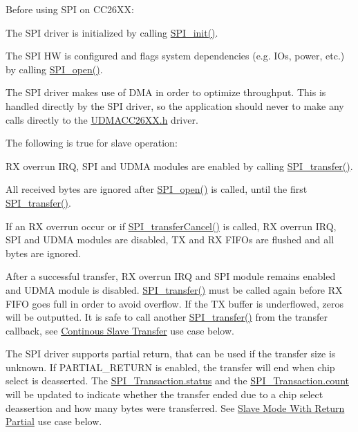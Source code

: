 Before using S\+P\+I on C\+C26\+X\+X\+:
\begin{DoxyItemize}
\item The S\+P\+I driver is initialized by calling \hyperlink{_s_p_i_8h_afd9b09f58917f0e2d14c61b956eba214}{S\+P\+I\+\_\+init()}.
\item The S\+P\+I H\+W is configured and flags system dependencies (e.\+g. I\+Os, power, etc.) by calling \hyperlink{_s_p_i_8h_a62cfe494cb1df47cd602e8747e894fd1}{S\+P\+I\+\_\+open()}.
\item The S\+P\+I driver makes use of D\+M\+A in order to optimize throughput. This is handled directly by the S\+P\+I driver, so the application should never to make any calls directly to the \hyperlink{_u_d_m_a_c_c26_x_x_8h}{U\+D\+M\+A\+C\+C26\+X\+X.\+h} driver.
\end{DoxyItemize}

The following is true for slave operation\+:
\begin{DoxyItemize}
\item R\+X overrun I\+R\+Q, S\+P\+I and U\+D\+M\+A modules are enabled by calling \hyperlink{_s_p_i_8h_a989e17f96b54fcc3dc2cac5f8ac6bdb2}{S\+P\+I\+\_\+transfer()}.
\item All received bytes are ignored after \hyperlink{_s_p_i_8h_a62cfe494cb1df47cd602e8747e894fd1}{S\+P\+I\+\_\+open()} is called, until the first \hyperlink{_s_p_i_8h_a989e17f96b54fcc3dc2cac5f8ac6bdb2}{S\+P\+I\+\_\+transfer()}.
\item If an R\+X overrun occur or if \hyperlink{_s_p_i_8h_a6819f7761fc3505c4f885653ff8121f0}{S\+P\+I\+\_\+transfer\+Cancel()} is called, R\+X overrun I\+R\+Q, S\+P\+I and U\+D\+M\+A modules are disabled, T\+X and R\+X F\+I\+F\+Os are flushed and all bytes are ignored.
\item After a successful transfer, R\+X overrun I\+R\+Q and S\+P\+I module remains enabled and U\+D\+M\+A module is disabled. \hyperlink{_s_p_i_8h_a989e17f96b54fcc3dc2cac5f8ac6bdb2}{S\+P\+I\+\_\+transfer()} must be called again before R\+X F\+I\+F\+O goes full in order to avoid overflow. If the T\+X buffer is underflowed, zeros will be outputted. It is safe to call another \hyperlink{_s_p_i_8h_a989e17f96b54fcc3dc2cac5f8ac6bdb2}{S\+P\+I\+\_\+transfer()} from the transfer callback, see \hyperlink{_s_p_i_c_c26_x_x_d_m_a_8h_USE_CASE_CST}{Continous Slave Transfer} use case below.
\item The S\+P\+I driver supports partial return, that can be used if the transfer size is unknown. If P\+A\+R\+T\+I\+A\+L\+\_\+\+R\+E\+T\+U\+R\+N is enabled, the transfer will end when chip select is deasserted. The \hyperlink{struct_s_p_i___transaction_aa244504b2384411f7de17340be62128a}{S\+P\+I\+\_\+\+Transaction.\+status} and the \hyperlink{struct_s_p_i___transaction_ad049d6a900c4bdb59a5ee8ce3d5bced2}{S\+P\+I\+\_\+\+Transaction.\+count} will be updated to indicate whether the transfer ended due to a chip select deassertion and how many bytes were transferred. See \hyperlink{_s_p_i_c_c26_x_x_d_m_a_8h_USE_CASE_RP}{Slave Mode With Return Partial} use case below.
\end{DoxyItemize}

